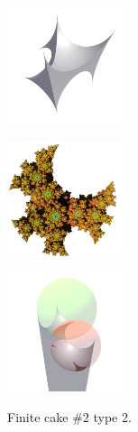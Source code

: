 \documentclass[suppldata, dvipdfmx]{interact}
\theoremstyle{plain}%
\theoremstyle{definition}
\theoremstyle{remark}
\theoremstyle{problemstyle}
\begin{document}
\begin{figure}[h!tbp]
 \begin{minipage}{0.5\textwidth}
  \begin{minipage}[t]{0.24\textwidth}
   \centering \includegraphics[width=1.35in, height=1.35in,
   keepaspectratio]{./img/sphairahedron/hexahedralCake2/sphairahedronFinite_b.jpg}
   \label{fig:cake2Type2FiniteSphairahedron}
  \end{minipage}
  \hspace*{\fill}
  \begin{minipage}[t]{0.24\textwidth}
   \centering
   \includegraphics[width=1.35in, height=1.35in,
   keepaspectratio]{./img/sphairahedron/hexahedralCake2/limitsetFinite_b.jpg}
   \label{fig:cake2Type2FiniteLimitset}
  \end{minipage}
  \hspace*{\fill}
  \caption{Finite cake \#2 type 2.}
  \label{fig:cake2Type2finite}
 \end{minipage}
 \hspace*{\fill}
 \begin{minipage}{0.5\textwidth}
  \begin{minipage}[t]{0.24\textwidth}
   \centering
   \includegraphics[width=1.35in, height=1.35in,
   keepaspectratio]{./img/sphairahedron/hexahedralCake2/sphairahedronInf_b.jpg}
   \label{fig:cake2Type2InfSphairahedron}

\end{minipage}
\end{minipage}
\end{figure}
\end{document}
